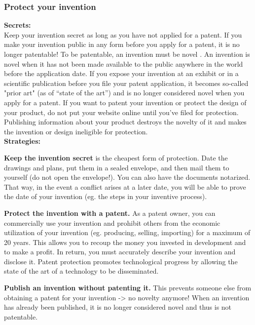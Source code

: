 \subsubsection{Protect your invention}
\textbf{Secrets:}\\
Keep your invention secret as long as you have not applied for a patent. If you make your invention public in any form before you apply for a patent, it is no longer patentable! To be patentable, an invention must be novel . An invention is novel when it has not been made available to the public anywhere in the world before the application date. If you expose your invention at an exhibit or in a scientific publication before you file your patent application, it becomes so-called "prior art" (as of “state of the art”) and is no longer considered novel when you apply for a patent. If you want to patent your invention or protect the design of your product, do not put your website online until you've filed for protection. Publishing information about your product destroys the novelty of it and makes the invention or design ineligible for protection.\\
\textbf{Strategies:}
\begin{compactitem}
	\item \textbf{Keep the invention secret} is the cheapest form of protection. Date the drawings and plans, put them in a sealed envelope, and then mail them to yourself (do not open the envelope!). You can also have the	documents notarized. That way, in the event a conflict arises at a later date, you will be able to prove the date of your invention (eg. the steps in your inventive process).
	\item \textbf{Protect the invention with a patent.} As a patent owner, you can commercially use your invention and prohibit others from the economic utilization of your invention (eg. producing, selling, importing) for a maximum of 20 years. This allows you to recoup the money you invested in	development and to make a profit. In return, you must accurately describe your invention and disclose it. Patent protection promotes	technological progress by allowing the state of the art of a technology to be disseminated.
	\item \textbf{Publish an invention without patenting it.} This prevents someone else from obtaining a patent for your invention -> no novelty anymore! When an invention has already been published, it is no longer considered novel and thus is not patentable.
\end{compactitem}

